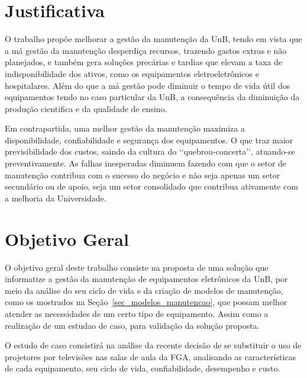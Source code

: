 
\section{Justificativa}

O trabalho propõe melhorar a gestão da manutenção da UnB, tendo em vista que a má gestão da manutenção desperdiça recursos, trazendo gastos extras e não planejados, e também gera soluções precárias e tardias que elevam a taxa de indisponibilidade dos ativos, como os equipamentos eletroeletrônicos e hospitalares. Além do que a má gestão pode diminuir o tempo de vida útil dos equipamentos tendo no caso particular da UnB, a consequência da diminuição da produção cientifica e da qualidade de ensino.

Em contrapartida, uma melhor gestão da manutenção maximiza a disponibilidade, confiabilidade e segurança dos equipamentos. O que traz maior previsibilidade dos custos, saindo da cultura do \lq\lq quebrou-concerta\rq\rq, atuando-se preventivamente. As falhas inesperadas diminuem fazendo com que o setor de manutenção contribua com o sucesso do negócio e não seja apenas um setor secundário ou de apoio, seja um setor consolidado que contribua ativamente com a melhoria da Universidade.




\section{Objetivo Geral}
 
O objetivo geral deste trabalho consiste na proposta de uma solução que informatize a gestão da manutenção de equipamentos eletrônicos da UnB, por meio da análise do seu ciclo de vida e da criação de modelos de manutenção, como os mostrados na Seção~\ref{sec_modelos_manutencao}, que possam melhor atender as necessidades de um certo tipo de equipamento. Assim como a realização de um estudao de caso, para validação da solução proposta. 

O estudo de caso consistirá na análise da recente decisão de se substituir o uso de projetores por televisões nas salas de aula da FGA, analisando as características de cada equipamento, seu ciclo de vida, confiabilidade, desempenho e custo.



